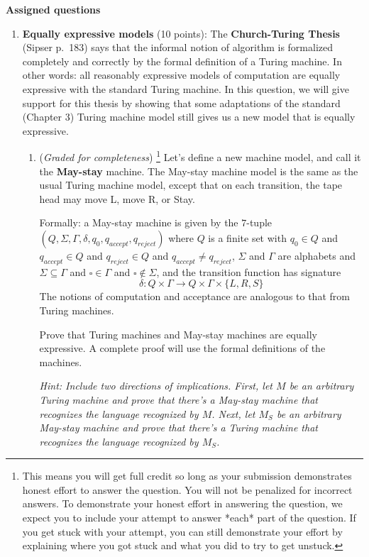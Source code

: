 \documentclass[12pt, oneside]{article}
\newcommand{\gradeComplete}{({\it Graded for completeness}) }
\newcommand{\gradeCompleteFirst}{\gradeComplete\footnote{This means you will 
get full credit so long as your submission demonstrates honest effort to 
answer the question. You will not be penalized for incorrect answers. 
To demonstrate your honest effort in answering the question, we 
expect you to include your attempt to answer *each* part of the question. 
If you get stuck with your attempt, you can still demonstrate 
your effort by explaining where you got stuck and what 
you did to try to get unstuck.} }
\begin{document}
{\bf Assigned questions}
\begin{enumerate}[wide, labelwidth=!, labelindent=0pt]

\item\textbf{Equally expressive models} (10 points):
The {\bf  Church-Turing Thesis} (Sipser p.~183) says that the informal notion of algorithm is formalized completely  and correctly by the 
formal definition of a  Turing machine. In other words: all reasonably expressive models of 
computation are equally expressive with the standard Turing machine.
In this question, we will give support for this thesis by showing that 
some adaptations of the standard (Chapter 3) Turing machine model still 
gives us a new model that is equally expressive.

\begin{enumerate}
\item\gradeCompleteFirst Let's define a new machine model, and call it the {\bf May-stay}  machine.
The May-stay machine model is the same as the usual Turing machine model,  except that
on each transition, the tape head may move L, move R, or Stay. 

Formally: a May-stay machine is given by the $7$-tuple
$(Q, \Sigma, \Gamma, \delta, q_0, q_{accept}, q_{reject})$ where 
$Q$ is a finite set with $q_0 \in Q$ and $q_{accept} \in Q$
and $q_{reject} \in Q$ and $q_{accept} \neq q_{reject}$, 
$\Sigma$ and $\Gamma$ are alphabets and $\Sigma \subseteq \Gamma$ and $\square \in \Gamma$ and $\square \notin \Sigma$, and the transition function 
has signature
\[
  \delta: Q \times \Gamma \to Q \times \Gamma \times \{L, R, S\}
\]
The notions of computation and acceptance are analogous to that from Turing machines.

Prove that Turing machines and May-stay machines are equally expressive.
A complete proof will use the formal definitions of the machines.

{\it Hint: Include two directions of implications. First, let $M$ be an 
arbitrary Turing machine and prove that there's a May-stay machine 
that recognizes the language recognized by $M$. Next, let $M_S$ 
be an arbitrary May-stay 
machine and prove that there's a Turing machine that recognizes the language
recognized by $M_S$.}


\end{enumerate}
\end{enumerate}
\end{document}
